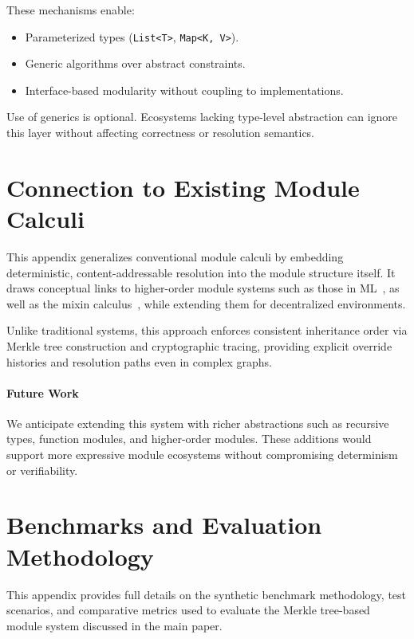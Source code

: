 \documentclass[sigplan,screen]{acmart}
\begin{document}
These mechanisms enable:
\begin{itemize}
  \item Parameterized types (\texttt{List<T>}, \texttt{Map<K, V>}).
  \item Generic algorithms over abstract constraints.
  \item Interface-based modularity without coupling to implementations.
\end{itemize}

Use of generics is optional. Ecosystems lacking type-level abstraction can ignore this layer without affecting correctness or resolution semantics.

\section{Connection to Existing Module Calculi}
\label{appendix:module-calculi}

This appendix generalizes conventional module calculi by embedding deterministic, content-addressable resolution into the module structure itself. It draws conceptual links to higher-order module systems such as those in ML~\cite{ml_modules}, as well as the mixin calculus~\cite{mixin_calculus}, while extending them for decentralized environments.

Unlike traditional systems, this approach enforces consistent inheritance order via Merkle tree construction and cryptographic tracing, providing explicit override histories and resolution paths even in complex graphs.

\paragraph{Future Work}

We anticipate extending this system with richer abstractions such as recursive types, function modules, and higher-order modules. These additions would support more expressive module ecosystems without compromising determinism or verifiability.

\section{Benchmarks and Evaluation Methodology}
\label{appendix:supplementary-evaluation}

This appendix provides full details on the synthetic benchmark methodology, test scenarios, and comparative metrics used to evaluate the Merkle tree-based module system discussed in the main paper.
\end{document}
